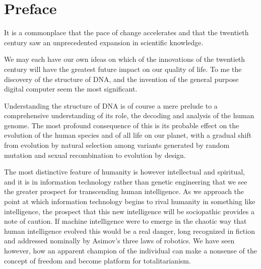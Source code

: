 
\newcommand{\listpositionname}{Positions}
\newlistof[chapter]{position}{pos}{\listpositionname}

\newcommand{\position}[2]{%
\refstepcounter{position}
{\paragraph{\textbf{#1 \theposition}} #2}
\addcontentsline{pos}{position}{\protect\numberline{\theposition} #2}\par}



\chapter*{Preface}\label{Preface}

It is a commonplace that the pace of change accelerates and that the twentieth century saw an unprecedented expansion in scientific knowledge.

We may each have our own ideas on which of the innovations of the twentieth century will have the greatest future impact on our quality of life.
To me the discovery of the structure of DNA, and the invention of the general purpose digital computer seem the most significant.

Understanding the structure of DNA is of course a mere prelude to a comprehensive understanding of its role, the decoding and analysis of the human genome.
The most profound consequence of this is its probable effect on the evolution of the human species and of all life on our planet, with a gradual shift from evolution by natural selection among variants generated by random mutation and sexual recombination to evolution by design.

The most distinctive feature of humanity is however intellectual and spiritual, and it is in information technology rather than genetic engineering that we see the greater prospect for transcending human intelligence.
As we approach the point at which information technology begins to rival humanity in something like intelligence, the prospect that this new intelligence will be sociopathic provides a note of caution.
If machine intelligence were to emerge in the chaotic way that human intelligence evolved this would be a real danger, long recognized in fiction and addressed nominally by Asimov's three laws of robotics.
We have seen however, how an apparent champion of the individual can make a nonsense of the concept of freedom and become platform for totalitarianism.

